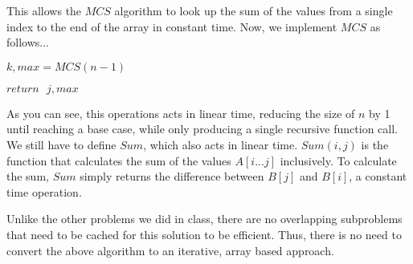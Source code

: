 \documentclass[12pt]{article}
\begin{document}
This allows the $MCS$ algorithm to look up the sum of the values from a single index to the end of the array in constant time.
Now, we implement $MCS$ as follows... \\

\begin{algorithm}[H]
\BlankLine
	$k, max = MCS(n-1)$
	
	$return \text{ } j, max$
\end{algorithm}

As you can see, this operations acts in linear time, reducing the size of $n$ by 1 until reaching a base case, while only producing a single recursive function call. We still have to define $Sum$, which also acts in linear time. $Sum(i, j)$ is the function that calculates the sum of the values $A[i...j]$ inclusively. To calculate the sum, $Sum$ simply returns the difference between $B[j]$ and $B[i]$, a constant time operation.

Unlike the other problems we did in class, there are no overlapping subproblems that need to be cached for this solution to be efficient. Thus, there is no need to convert the above algorithm to an iterative, array based approach.
\end{document}
